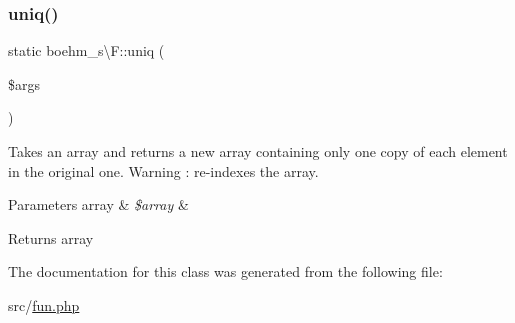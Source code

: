 \subsubsection{\texorpdfstring{uniq()}{uniq()}}
{\footnotesize\ttfamily static boehm\+\_\+s\textbackslash{}\+F\+::uniq (\begin{DoxyParamCaption}\item[{}]{\$args }\end{DoxyParamCaption})\hspace{0.3cm}{\ttfamily [static]}}

Takes an array and returns a new array containing only one copy of each element in the original one. Warning \+: re-\/indexes the array.


\begin{DoxyParams}[1]{Parameters}
array & {\em \$array} & \\
\hline
\end{DoxyParams}
\begin{DoxyReturn}{Returns}
array 
\end{DoxyReturn}


The documentation for this class was generated from the following file\+:\begin{DoxyCompactItemize}
\item 
src/\hyperlink{fun_8php}{fun.\+php}\end{DoxyCompactItemize}
